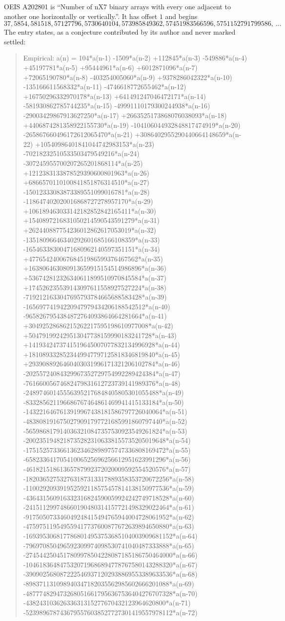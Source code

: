 \documentclass[11pt,a4paper]{article}
\theoremstyle{plain}
\theoremstyle{definition}
\begin{document}
OEIS A202801 is ``Number of nX7 binary arrays with every one adjacent to another one horizontally or vertically.''. It has offset $1$ and begins
\[
37, 5854, 581518, 57127796, 5730640104, 573985849362, 57451983566596, 5751152791799586,\ \dots
\]
The entry states, as a conjecture contributed by its author and never marked settled:
\begin{quote}
Empirical: a(n) = 104*a(n-1) -1509*a(n-2) +112845*a(n-3) -549886*a(n-4) +45197781*a(n-5) +95444961*a(n-6) +6012871096*a(n-7) +72065190780*a(n-8) -403254005060*a(n-9) +9378286042322*a(n-10) -135166611568332*a(n-11) -4746618772655462*a(n-12) +16750296332970178*a(n-13) +641491247046472171*a(n-14) -581930862785744235*a(n-15) -49991110179300244938*a(n-16) -29003429867913627250*a(n-17) +2663525173868076038093*a(n-18) +4406874281358922155730*a(n-19) -104106044932848817474919*a(n-20) -265867660496172612065470*a(n-21) +3086402955290440664148659*a(n-22) +10540986401841044742983153*a(n-23) -70218232510533503479549216*a(n-24) -307245955700207265201868114*a(n-25) +1212383133878529390600801963*a(n-26) +6866570110100841851876314510*a(n-27) -15012333083873389551099016781*a(n-28) -118647402020016868727278957170*a(n-29) +106189463033142182852842165411*a(n-30) +1540897216831050214590543591279*a(n-31) +262440887754236012862617053019*a(n-32) -13518096646340292601685166108359*a(n-33) -16546338300471680962140597351151*a(n-34) +47765424006768451986599376467562*a(n-35) +163806463080913659915154514986896*a(n-36) +536742812326340611899510970845584*a(n-37) +174526235539143097611558927527224*a(n-38) -7192121633047695793784665688583428*a(n-39) -16569774194220947979434206188542512*a(n-40) -9658267954384872764093864664281664*a(n-41) +30492528686215262217595198610977008*a(n-42) +504791992429513047738159990183241728*a(n-43) +1419342473741519645007077832134996928*a(n-44) +1810893328523449947797125818346819840*a(n-45) +2939088926460403031996171321206102784*a(n-46) -20255724084329967352729754992289424384*a(n-47) -76166005674682479831612723739141989376*a(n-48) -248974601455563952176848405805301055488*a(n-49) -833285621196686767464861469941415133184*a(n-50) -1432216467613919967438181586797726040064*a(n-51) -4838081916750279091797721685991860797440*a(n-52) -5659868179140363210847357530923549261824*a(n-53) -20023519482187352823106338155735205019648*a(n-54) -17515257336613623462898975747336808169472*a(n-55) -65823364170541006525696256612951623991296*a(n-56) -46182151861365787992372020009592554520576*a(n-57) -182036527532763187313317889358353720672256*a(n-58) -110029209391952592118575457814138150977536*a(n-59) -436431560916332316824590059924242749718528*a(n-60) -241511299748660190480314157721498329022464*a(n-61) -917505073346049248415494765944004728061952*a(n-62) -475975119549559417737600877672639894650880*a(n-63) -1693953068177868014953753685104003909681152*a(n-64) -796970850496592309974098530741040487333888*a(n-65) -2745442504517809978504228087185186750464000*a(n-66) -1046183648475320719686894778767580143288320*a(n-67) -3909025680872225469371202938869553389633536*a(n-68) -898371131098940347182035562985602666201088*a(n-69) -4877748294732680516617956367536404276707328*a(n-70) -43824310362633631315277670432123964620800*a(n-71) -5239896787436795576038527727301419557978112*a(n-72) 
\end{quote}
\end{document}
